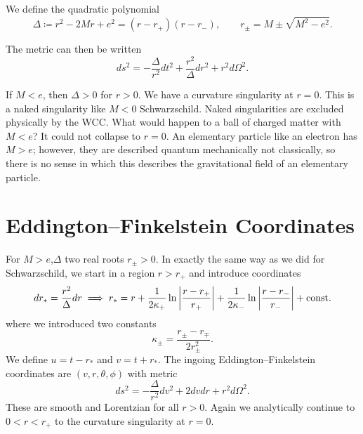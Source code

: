 
\begin{notation}[]
  We define the quadratic polynomial
  \begin{equation}
    \Delta \coloneqq r^2 - 2 M r + e^2 = (r - r_+) (r - r_-), \qquad r_{\pm} = M \pm \sqrt{M^2 - e^2}.
  \end{equation}
\end{notation}
The metric can then be written
\begin{equation}
  ds^2 = -\frac{\Delta}{r^2}  dt^2 + \frac{r^2}{\Delta} dr^2 + r^2 d\Omega^2.
\end{equation}

If $M < e$, then $\Delta > 0$ for $r > 0$. We have a curvature singularity at $r = 0$. This is a naked singularity like $M < 0$ Schwarzschild.
Naked singularities are excluded physically by the WCC.
What would happen to a ball of charged matter with $M < e$? It could not collapse to $r = 0$.
An elementary particle like an electron has $M > e$; however, they are described quantum mechanically not classically, so there is no sense in which this describes the gravitational field of an elementary particle.

\section{Eddington--Finkelstein Coordinates}%
\label{sec:eddington_finkelstein_coordinates_II}

For $M> e$,$\Delta$ two real roots $r_{\pm} > 0$.
In exactly the same way as we did for Schwarzschild, we start in a region $r > r_+$ and introduce coordinates
\begin{equation}
  dr_* = \frac{r^2}{\Delta} dr \implies r_* = r + \frac{1}{2 \kappa_+} \ln \abs{\frac{r - r_+}{r_+}} + \frac{1}{2 \kappa_-} \ln \abs{\frac{r - r_-}{r_-}} + \text{const.}
\end{equation}
where we introduced two constants 
\begin{equation}
  \label{eq:14-kappa}
  \kappa_{\pm} = \frac{r_{\pm} - r_{\mp}}{2 r_{\pm}^2}.
\end{equation}
We define $u = t - r_*$ and $v = t + r_*$. 
The ingoing Eddington--Finkelstein coordinates are $(v, r, \theta, \phi)$ with metric
\begin{equation}
  ds^2= - \frac{\Delta}{r^2} dv^2 + 2 d v d r + r^2 d\Omega^2.
\end{equation}
These are smooth and Lorentzian for all $r > 0$. Again we analytically continue to $0 < r < r_+$ to the curvature singularity at $r = 0$.

